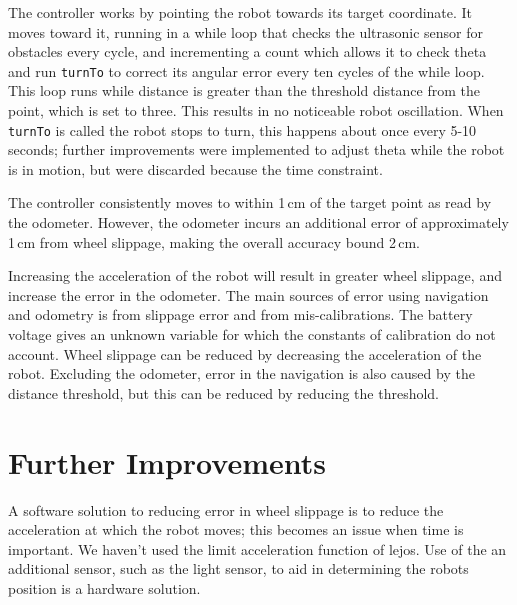 \documentclass[twocolumn]{article}
\begin{document}
The controller works by pointing the robot towards its target coordinate. It moves toward it, running in a while loop that checks the ultrasonic sensor for obstacles every cycle, and incrementing a count which allows it to check theta and run {\tt turnTo} to correct its angular error every ten cycles of the while loop. This loop runs while distance is greater than the threshold distance from the point, which is set to three. This results in no noticeable robot oscillation. When {\tt turnTo} is called the robot stops to turn, this happens about once every 5-10 seconds; further improvements were implemented to adjust theta while the robot is in motion, but were discarded because the time constraint.

The controller consistently moves to within 1\,cm of the target point as read by the odometer. However, the odometer incurs an additional error of approximately 1\,cm from wheel slippage, making the overall accuracy bound 2\,cm.

Increasing the acceleration of the robot will result in greater wheel slippage, and increase the error in the odometer. The main sources of error using navigation and odometry is from slippage error and from mis-calibrations. The battery voltage gives an unknown variable for which the constants of calibration do not account. Wheel slippage can be reduced by decreasing the acceleration of the robot. Excluding the odometer, error in the navigation is also caused by the distance threshold, but this can be reduced by reducing the threshold.

\section{Further Improvements}

A software solution to reducing error in wheel slippage is to reduce the acceleration at which the robot moves; this becomes an issue when time is important. We haven't used the limit acceleration function of lejos. Use of the an additional sensor, such as the light sensor, to aid in determining the robots position is a hardware solution.
\end{document}
